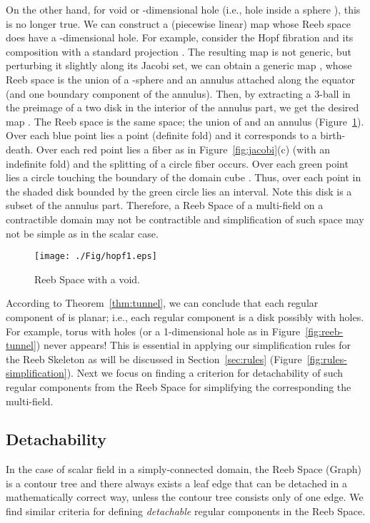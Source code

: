 \documentclass[twocolumn]{article}
\begin{document}
On the other hand, for void or -dimensional hole (i.e., hole inside a sphere ),
this is no longer true. We can construct a (piecewise
linear) map  whose Reeb space does have
a -dimensional hole. For example, consider the Hopf
fibration  and its composition with
a standard projection . The resulting map
 is not generic, but perturbing
it slightly along its Jacobi set, we can obtain
a generic map , whose Reeb space is
the union of a -sphere and an annulus attached
along the equator (and one boundary component of
the annulus). Then, by extracting a 3-ball
in the preimage of a two disk in the interior
of the annulus part, we get the desired map .
The Reeb space is the same space; the union of
 and an annulus (Figure~\ref{fig:hopf}).
Over each blue point lies a point (definite fold)
and it corresponds to a birth-death.
Over each red point lies a fiber as in Figure~\ref{fig:jacobi}(c) (with an
indefinite fold) and the splitting of a circle fiber
occurs. Over each green point lies a circle touching the
boundary of the domain cube . Thus,
over each point in the shaded disk bounded
by the green circle lies an interval.
 Note this disk is a subset of the
annulus part. Therefore, a Reeb Space of a multi-field
on a contractible domain may not be contractible and 
simplification of such space may not be simple as in 
the scalar case. 
\begin{figure}[t!]
\begin{center}
\texttt{[image: ./Fig/hopf1.eps]}
\caption{Reeb Space with a void.}
\label{fig:hopf}
\end{center}
\end{figure} 

According to Theorem~\ref{thm:tunnel},
we can conclude that each regular component of  is
planar; i.e., each regular component is a disk possibly with
holes. For example, torus with holes (or a 1-dimensional hole as in Figure~\ref{fig:reeb-tunnel}) never appears!
This is essential in applying our simplification
rules for the Reeb Skeleton as will be discussed in
Section~\ref{sec:rules} (Figure~\ref{fig:rules-simplification}).
Next we focus on finding a criterion for detachability of such regular
components from the Reeb Space for simplifying the 
corresponding the multi-field. 


\subsection{Detachability}
\label{subsec:detach}
In the case of scalar field in a simply-connected domain,
the Reeb Space (Graph) is a contour tree and there always exists a leaf edge that can be
detached in a mathematically correct way,
unless the contour tree consists only of one edge.
We find similar criteria for defining
\emph{detachable} regular components in the Reeb Space.
\end{document}

